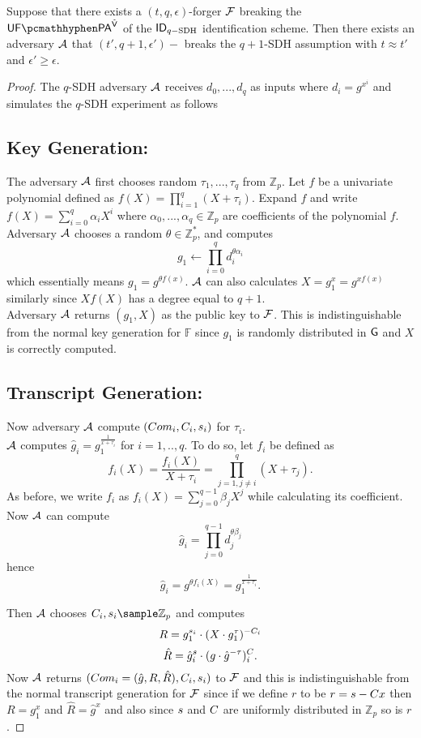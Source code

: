 \begin{theorem}
Suppose that there exists a $(t, q, \epsilon)$-forger $\mathcal{F}$ breaking the $\imp^{\IDAltV}$ of the $\mathsf{ID}_{q-\text{SDH}}$ identification scheme. Then there exists an adversary $\mathcal{A}$ that $(t',q+1,\epsilon')-$ breaks the $q+1$-SDH assumption with $t \approx t'$ and 
$\epsilon' \geq \epsilon.$
\end{theorem}
\begin{proof}
The $q$-SDH adversary $\mathcal{A}$ receives $d_0,...,d_q$ as inputs where $d_i = g^{x^i}$ and simulates the $q$-SDH experiment as follows
\subsection*{Key Generation:} The adversary $\mathcal{A}$ first chooses random $\tau_1,...,\tau_q$ from $\mathbb{Z}_p$. Let $f$ be a univariate polynomial defined as 
$f(X) = \prod_{i=1}^q (X+\tau_i)$. Expand $f$ and write $f(X) = \sum_{i=0}^q \alpha_i X^i$ where
$\alpha_0,...,\alpha_q \in \mathbb{Z}_p$ are coefficients of the polynomial $f$. Adversary $\mathcal{A}$ chooses a random $\theta \in \mathbb{Z}^*_p$, and computes
$$g_1 \leftarrow \prod_{i=0}^q d_i^{\theta\alpha_i}$$
which essentially means $g_1 = g^{\theta f(x)}$. $\mathcal{A}$ can also calculates 
$X = g_1^x = g^{xf(x)}$ similarly since $Xf(X)$ has a degree equal to $q+1$.
\\
Adversary $\mathcal{A}$ returns $(g_1,X)$ as the public key to $\mathcal{F}$. This is indistinguishable from the normal key generation for $\mathbb{F}$ since $g_1$ is randomly distributed in $\mathsf{G}$ and $X$ is correctly computed.

\subsection*{Transcript Generation:}
Now adversary $\mathcal{A}$ compute $(Com_i,C_i,s_i)$ for $\tau_i$.
\\
$\mathcal{A}$ computes
$\hat{g}_i = g_1^{\frac{1}{x+\tau_i}}$ for $i = 1,..,q$. To do so, let $f_i$ be defined as
$$f_i(X) = \frac{f_i(X)}{X+\tau_i} = \prod_{j=1, j \neq i}^q (X+ \tau_j).$$
As before, we write $f_i$ as 
$f_i(X) = \sum_{j=0}^{q-1} \beta_jX^j$ while calculating its coefficient.  Now $\mathcal{A}$ can compute
$$\hat{g}_i = \prod_{j=0}^{q-1} d_j^{\theta\beta_j}$$
hence
$$\hat{g}_i = g^{\theta f_i(X)} =  g_1^{\frac{1}{x+\tau_i}}.$$




 Then $\mathcal{A}$ chooses  $\c_i,\s_i\sample\mathbb{Z}_p$ and computes
$$R = g_1^{s_i }\cdot(X\cdot g_1^{\tau})^{-C_i} $$
$$\hat{R} = \hat{g}^s_i \cdot (g\cdot \hat{g}^{-\tau} )^C_i.$$
Now $\mathcal{A}$ returns $(Com_i = (\hat{g},R,\hat{R}),C_i,s_i)$ to $\mathcal{F}$ and this is indistinguishable from the normal transcript generation for $\mathcal{F}$ since if we define $r$ to be $r = s-C x$ then $R = g_1^x$ and 
$\hat{R} = \hat{g}^x$ and also since $s$ and $C$ are uniformly distributed in $\mathbb{Z}_p$ so is $r$.

\end{proof}
